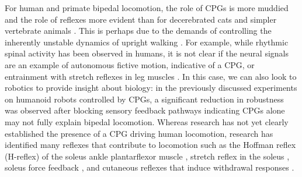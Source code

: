 For human and primate bipedal locomotion, the role of CPGs is more muddied and
the role of reflexes more evident than for decerebrated cats and simpler
vertebrate animals \citep{mackay2002central, vaughan2003theories,
nielsen2003we}. This is perhaps due to the demands of controlling the inherently
unstable dynamics of upright walking \citep{capaday2002special}. For example,
while rhythmic spinal activity has been observed in humans, it is not clear if
the neural signals are an example of autonomous fictive motion, indicative of a
CPG, or entrainment with stretch reflexes in leg muscles
\citep{capaday2002special, stewart1991modulation}. In this case, we can also
look to robotics to provide insight about biology: in the previously discussed
experiments on humanoid robots controlled by CPGs, a significant reduction in
robustness was observed after blocking sensory feedback pathways
\citep{endo2005experimental, righetti2006programmable} indicating CPGs alone may
not fully explain bipedal locomotion. Whereas research has not yet clearly
established the presence of a CPG driving human locomotion, research has
identified many reflexes that contribute to locomotion such as the Hoffman
reflex (H-reflex) of the soleus ankle plantarflexor muscle
\citep{capaday1987difference}, stretch reflex in the soleus
\citep{yang1991contribution}, soleus force feedback \citep{grey2007positive},
and cutaneous reflexes that induce withdrawal responses \citep{yang1990phase}. 

